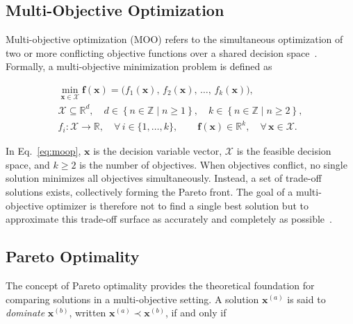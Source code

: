 \subsection{Multi-Objective Optimization}
\label{subsubsec:multi_objective_optimization}

Multi-objective optimization (MOO) refers to the simultaneous optimization of two or more conflicting objective functions over a shared decision
space~\cite{Deb2011Multi-objective}. Formally, a multi-objective minimization problem is defined as

\begin{equation}
    \label{eq:moop}
    \begin{gathered}
        \min_{\mathbf{x} \in \mathcal{X}} \mathbf{f}(\mathbf{x}) =
        \bigl(f_1(\mathbf{x}),\, f_2(\mathbf{x}),\, \ldots,\, f_k(\mathbf{x})\bigr),
        \\[4pt]
        \mathcal{X} \subseteq \mathbb{R}^{d},
        \quad
        d \in \left\{ n \in \mathbb{Z} \mid n \ge 1 \right\},
        \quad
        k \in \left\{ n \in \mathbb{Z} \mid n \ge 2 \right\},
        \\[4pt]
        f_i : \mathcal{X} \rightarrow \mathbb{R},
        \quad
        \forall\, i \in \{1,\ldots,k\},
        \qquad
        \mathbf{f}(\mathbf{x}) \in \mathbb{R}^{k},
        \quad
        \forall\, \mathbf{x} \in \mathcal{X}.
    \end{gathered}
\end{equation}

In Eq.~\ref{eq:moop}, $\mathbf{x}$ is the decision variable vector, $\mathcal{X}$ is the feasible decision space, and $k \geq 2$ is the number of objectives. When
objectives conflict, no single solution minimizes all objectives simultaneously. Instead, a set of trade-off solutions exists, collectively forming
the Pareto front. The goal of a multi-objective optimizer is therefore not to find a single best solution but to approximate this trade-off surface as
accurately and completely as possible~\cite{Deb2011Multi-objective,Gunantara2018A}.

\subsection{Pareto Optimality}
\label{subsubsec:pareto_optimality}

The concept of Pareto optimality provides the theoretical foundation for comparing solutions in a multi-objective setting. A solution
$\mathbf{x}^{(a)}$ is said to \emph{dominate} $\mathbf{x}^{(b)}$, written $\mathbf{x}^{(a)} \prec \mathbf{x}^{(b)}$, if and only if

